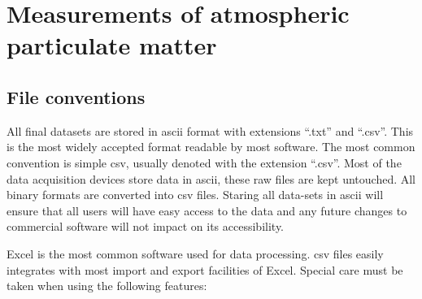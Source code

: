 \documentclass{nwureport}
\begin{document}

\chapter{Measurements of atmospheric particulate matter}

\section{File conventions}

All final datasets are stored in \gls{ascii} format with extensions
``.txt'' and ``.csv''. This is the most
widely accepted format readable by most software. The most common
convention is simple \gls{csv}, usually denoted with the extension
``.csv''. Most of the data acquisition devices
store data in \gls{ascii}, these raw files are kept untouched. All
binary formats are converted into \gls{csv} files. Staring all
data-sets in \gls{ascii} will ensure that all users will have easy
access to the data and any future changes to commercial software will
not impact on its accessibility.

Excel is the most common software used for data processing. \gls{csv}
files easily integrates with most import and export facilities of
Excel. Special care must be taken when using the following features:
\end{document}
